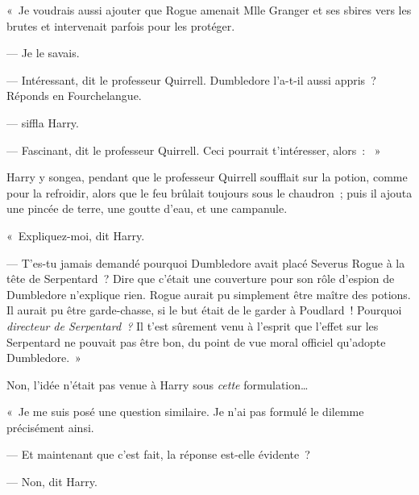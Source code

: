 «~Je voudrais aussi ajouter que Rogue amenait Mlle Granger et ses sbires vers les brutes et intervenait parfois pour les protéger.

--- Je le savais.

--- Intéressant, dit le professeur Quirrell. Dumbledore l'a-t-il aussi appris~? Réponds en Fourchelangue.

---  siffla Harry.

--- Fascinant, dit le professeur Quirrell. Ceci pourrait t'intéresser, alors~: ~»

Harry y songea, pendant que le professeur Quirrell soufflait sur la potion, comme pour la refroidir, alors que le feu brûlait toujours sous le chaudron~; puis il ajouta une pincée de terre, une goutte d'eau, et une campanule.

«~Expliquez-moi, dit Harry.

--- T'es-tu jamais demandé pourquoi Dumbledore avait placé Severus Rogue à la tête de Serpentard~? Dire que c'était une couverture pour son rôle d'espion de Dumbledore n'explique rien. Rogue aurait pu simplement être maître des potions. Il aurait pu être garde-chasse, si le but était de le garder à Poudlard~! Pourquoi \emph{directeur de Serpentard~?} Il t'est sûrement venu à l'esprit que l'effet sur les Serpentard ne pouvait pas être bon, du point de vue moral officiel qu'adopte Dumbledore.~»

Non, l'idée n'était pas venue à Harry sous \emph{cette} formulation…

«~Je me suis posé une question similaire. Je n'ai pas formulé le dilemme précisément ainsi.

--- Et maintenant que c'est fait, la réponse est-elle évidente~?

--- Non, dit Harry.

